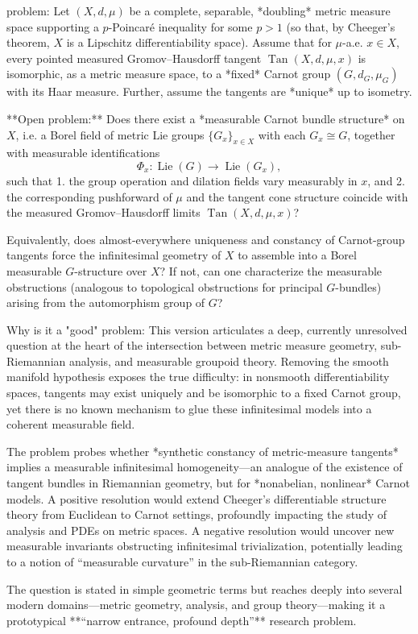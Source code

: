 problem:  
Let \((X,d,\mu)\) be a complete, separable, *doubling* metric measure space supporting a \(p\)-Poincaré inequality for some \(p>1\) (so that, by Cheeger’s theorem, \(X\) is a Lipschitz differentiability space).  
Assume that for \(\mu\)-a.e. \(x\in X\), every pointed measured Gromov–Hausdorff tangent \(\operatorname{Tan}(X,d,\mu,x)\) is isomorphic, as a metric measure space, to a *fixed* Carnot group \((G,d_G,\mu_G)\) with its Haar measure.  
Further, assume the tangents are *unique* up to isometry.  

**Open problem:**  
Does there exist a *measurable Carnot bundle structure* on \(X\), i.e. a Borel field of metric Lie groups \(\{G_x\}_{x\in X}\) with each \(G_x\cong G\), together with measurable identifications  
\[
\Phi_x:\operatorname{Lie}(G)\to\operatorname{Lie}(G_x),
\]
such that  
1. the group operation and dilation fields vary measurably in \(x\), and  
2. the corresponding pushforward of \(\mu\) and the tangent cone structure coincide with the measured Gromov–Hausdorff limits \(\operatorname{Tan}(X,d,\mu,x)\)?  

Equivalently, does almost-everywhere uniqueness and constancy of Carnot-group tangents force the infinitesimal geometry of \(X\) to assemble into a Borel measurable \(G\)-structure over \(X\)?  
If not, can one characterize the measurable obstructions (analogous to topological obstructions for principal \(G\)-bundles) arising from the automorphism group of \(G\)?

Why is it a "good" problem:  
This version articulates a deep, currently unresolved question at the heart of the intersection between metric measure geometry, sub-Riemannian analysis, and measurable groupoid theory. Removing the smooth manifold hypothesis exposes the true difficulty: in nonsmooth differentiability spaces, tangents may exist uniquely and be isomorphic to a fixed Carnot group, yet there is no known mechanism to glue these infinitesimal models into a coherent measurable field.  

The problem probes whether *synthetic constancy of metric-measure tangents* implies a measurable infinitesimal homogeneity—an analogue of the existence of tangent bundles in Riemannian geometry, but for *nonabelian, nonlinear* Carnot models. A positive resolution would extend Cheeger’s differentiable structure theory from Euclidean to Carnot settings, profoundly impacting the study of analysis and PDEs on metric spaces. A negative resolution would uncover new measurable invariants obstructing infinitesimal trivialization, potentially leading to a notion of “measurable curvature” in the sub-Riemannian category.  

The question is stated in simple geometric terms but reaches deeply into several modern domains—metric geometry, analysis, and group theory—making it a prototypical **“narrow entrance, profound depth”** research problem.